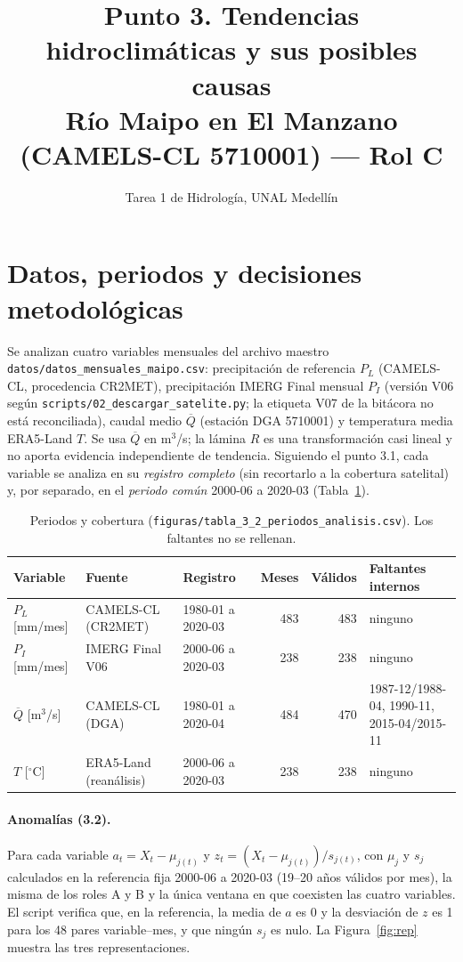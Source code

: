 \documentclass[11pt,letterpaper]{article}
\title{Punto 3. Tendencias hidroclimáticas y sus posibles causas\\
\large Río Maipo en El Manzano (CAMELS-CL 5710001) --- Rol C}
\author{Tarea 1 de Hidrología, UNAL Medellín}
\date{}
\begin{document}
\sloppy
\maketitle

\section{Datos, periodos y decisiones metodológicas}

Se analizan cuatro variables mensuales del archivo maestro \texttt{datos/datos\_mensuales\_maipo.csv}:
precipitación de referencia $P_L$ (CAMELS-CL, procedencia CR2MET), precipitación IMERG Final mensual $P_I$
(versión V06 según \texttt{scripts/02\_descargar\_satelite.py}; la etiqueta V07 de la bitácora no está reconciliada),
caudal medio $\overline{Q}$ (estación DGA 5710001) y temperatura media ERA5-Land $T$. Se usa $\overline{Q}$ en
m$^3$/s; la lámina $R$ es una transformación casi lineal y no aporta evidencia independiente de tendencia.
Siguiendo el punto 3.1, cada variable se analiza en su \emph{registro completo} (sin recortarlo a la cobertura
satelital) y, por separado, en el \emph{periodo común} 2000-06 a 2020-03 (Tabla~\ref{tab:periodos}).

\begin{table}[H]
\centering\footnotesize\setlength{\tabcolsep}{4pt}
\caption{Periodos y cobertura (\texttt{figuras/tabla\_3\_2\_periodos\_analisis.csv}). Los faltantes no se rellenan.}
\label{tab:periodos}
\begin{tabular}{lllrrl}
\toprule
Variable & Fuente & Registro & Meses & Válidos & Faltantes internos \\
\midrule
$P_L$ [mm/mes] & CAMELS-CL (CR2MET) & 1980-01 a 2020-03 & 483 & 483 & ninguno \\
$P_I$ [mm/mes] & IMERG Final V06 & 2000-06 a 2020-03 & 238 & 238 & ninguno \\
$\overline{Q}$ [m$^3$/s] & CAMELS-CL (DGA) & 1980-01 a 2020-04 & 484 & 470 & \shortstack[l]{1987-12/1988-04, 1990-11,\\ 2015-04/2015-11} \\
$T$ [$^\circ$C] & ERA5-Land (reanálisis) & 2000-06 a 2020-03 & 238 & 238 & ninguno \\
\bottomrule
\end{tabular}
\end{table}

\paragraph{Anomalías (3.2).} Para cada variable $a_t = X_t-\mu_{j(t)}$ y $z_t=(X_t-\mu_{j(t)})/s_{j(t)}$, con
$\mu_j$ y $s_j$ calculados en la referencia fija 2000-06 a 2020-03 (19--20 años válidos por mes), la misma de
los roles A y B y la única ventana en que coexisten las cuatro variables. El script verifica que, en la
referencia, la media de $a$ es 0 y la desviación de $z$ es 1 para los 48 pares variable--mes, y que ningún
$s_j$ es nulo. La Figura~\ref{fig:rep} muestra las tres representaciones.
\end{document}
